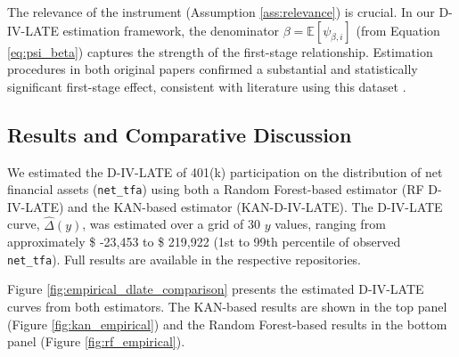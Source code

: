 \documentclass[final,3p,fleqn, 10pt]{elsarticle}
\begin{document}
The relevance of the instrument (Assumption \ref{ass:relevance}) is crucial. In our D-IV-LATE estimation framework, the denominator $\beta = \mathbb{E}[\psi_{\beta,i}]$ (from Equation \ref{eq:psi_beta}) captures the strength of the first-stage relationship. Estimation procedures in both original papers confirmed a substantial and statistically significant first-stage effect, consistent with literature using this dataset \citep[e.g.,][]{chernozhukov2004impact}.

\subsection{Results and Comparative Discussion}
We estimated the D-IV-LATE of 401(k) participation on the distribution of net financial assets (\texttt{net\_tfa}) using both a Random Forest-based estimator (RF D-IV-LATE) and the KAN-based estimator (KAN-D-IV-LATE). The D-IV-LATE curve, $\hat{\Delta}(y)$, was estimated over a grid of 30 $y$ values, ranging from approximately \$ -23,453 to \$ 219,922 (1st to 99th percentile of observed \texttt{net\_tfa}). Full results are available in the respective repositories.

Figure \ref{fig:empirical_dlate_comparison} presents the estimated D-IV-LATE curves from both estimators. The KAN-based results are shown in the top panel (Figure \ref{fig:kan_empirical}) and the Random Forest-based results in the bottom panel (Figure \ref{fig:rf_empirical}).
\end{document}
